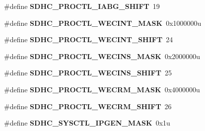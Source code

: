 \begin{DoxyCompactItemize}
\item 
\#define {\bfseries S\+D\+H\+C\+\_\+\+P\+R\+O\+C\+T\+L\+\_\+\+I\+A\+B\+G\+\_\+\+S\+H\+I\+FT}~19\hypertarget{group__SDHC__Register__Masks_gaf62ddb022a19e9fe0ce3d39eeffadd4a}{}\label{group__SDHC__Register__Masks_gaf62ddb022a19e9fe0ce3d39eeffadd4a}

\item 
\#define {\bfseries S\+D\+H\+C\+\_\+\+P\+R\+O\+C\+T\+L\+\_\+\+W\+E\+C\+I\+N\+T\+\_\+\+M\+A\+SK}~0x1000000u\hypertarget{group__SDHC__Register__Masks_ga08649036ee7355491608a89004ab0628}{}\label{group__SDHC__Register__Masks_ga08649036ee7355491608a89004ab0628}

\item 
\#define {\bfseries S\+D\+H\+C\+\_\+\+P\+R\+O\+C\+T\+L\+\_\+\+W\+E\+C\+I\+N\+T\+\_\+\+S\+H\+I\+FT}~24\hypertarget{group__SDHC__Register__Masks_ga575db16a4ed36389472243d329f5ec7c}{}\label{group__SDHC__Register__Masks_ga575db16a4ed36389472243d329f5ec7c}

\item 
\#define {\bfseries S\+D\+H\+C\+\_\+\+P\+R\+O\+C\+T\+L\+\_\+\+W\+E\+C\+I\+N\+S\+\_\+\+M\+A\+SK}~0x2000000u\hypertarget{group__SDHC__Register__Masks_gabd871a9e13415808e1743df5b4758d83}{}\label{group__SDHC__Register__Masks_gabd871a9e13415808e1743df5b4758d83}

\item 
\#define {\bfseries S\+D\+H\+C\+\_\+\+P\+R\+O\+C\+T\+L\+\_\+\+W\+E\+C\+I\+N\+S\+\_\+\+S\+H\+I\+FT}~25\hypertarget{group__SDHC__Register__Masks_ga33b81350df7f8c5cc698135c271bbfbb}{}\label{group__SDHC__Register__Masks_ga33b81350df7f8c5cc698135c271bbfbb}

\item 
\#define {\bfseries S\+D\+H\+C\+\_\+\+P\+R\+O\+C\+T\+L\+\_\+\+W\+E\+C\+R\+M\+\_\+\+M\+A\+SK}~0x4000000u\hypertarget{group__SDHC__Register__Masks_ga296669c47b763f48caf28c35c1be2240}{}\label{group__SDHC__Register__Masks_ga296669c47b763f48caf28c35c1be2240}

\item 
\#define {\bfseries S\+D\+H\+C\+\_\+\+P\+R\+O\+C\+T\+L\+\_\+\+W\+E\+C\+R\+M\+\_\+\+S\+H\+I\+FT}~26\hypertarget{group__SDHC__Register__Masks_ga6f445b202ea272428a7507952b79a889}{}\label{group__SDHC__Register__Masks_ga6f445b202ea272428a7507952b79a889}

\item 
\#define {\bfseries S\+D\+H\+C\+\_\+\+S\+Y\+S\+C\+T\+L\+\_\+\+I\+P\+G\+E\+N\+\_\+\+M\+A\+SK}~0x1u\hypertarget{group__SDHC__Register__Masks_ga35cc08217531a736cec185c65abe7f82}{}\label{group__SDHC__Register__Masks_ga35cc08217531a736cec185c65abe7f82}


\end{DoxyCompactItemize}
